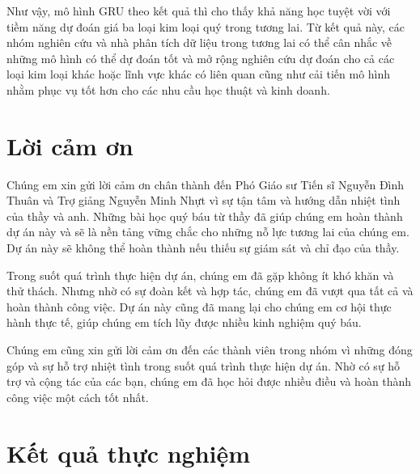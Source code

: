 \documentclass[conference]{IEEEtran}
\begin{document}
\indent Như vậy, mô hình GRU theo kết quả thì cho thấy khả năng học tuyệt vời với tiềm năng dự đoán giá ba loại kim loại quý trong tương lai. Từ kết quả này, các nhóm nghiên cứu và nhà phân tích dữ liệu trong tương lai có thể cân nhắc về những mô hình có thể dự đoán tốt và mở rộng nghiên cứu dự đoán cho cả các loại kim loại khác hoặc lĩnh vực khác có liên quan cũng như cải tiến mô hình nhằm phục vụ tốt hơn cho các nhu cầu học thuật và kinh doanh.

\section*{Lời cảm ơn}


Chúng em xin gửi lời cảm ơn chân thành đến Phó Giáo sư Tiến sĩ Nguyễn Đình Thuân và Trợ giảng Nguyễn Minh Nhựt vì sự tận tâm và hướng dẫn nhiệt tình của thầy và anh. Những bài học quý báu từ thầy đã giúp chúng em hoàn thành dự án này và sẽ là nền tảng vững chắc cho những nỗ lực tương lai của chúng em. Dự án này sẽ không thể hoàn thành nếu thiếu sự giám sát và chỉ đạo của thầy.

Trong suốt quá trình thực hiện dự án, chúng em đã gặp không ít khó khăn và thử thách. Nhưng nhờ có sự đoàn kết và hợp tác, chúng em đã vượt qua tất cả và hoàn thành công việc. Dự án này cũng đã mang lại cho chúng em cơ hội thực hành thực tế, giúp chúng em tích lũy được nhiều kinh nghiệm quý báu.

Chúng em cũng xin gửi lời cảm ơn đến các thành viên trong nhóm vì những đóng góp và sự hỗ trợ nhiệt tình trong suốt quá trình thực hiện dự án. Nhờ có sự hỗ trợ và cộng tác của các bạn, chúng em đã học hỏi được nhiều điều và hoàn thành công việc một cách tốt nhất.
\section{Kết quả thực nghiệm}
\end{document}
